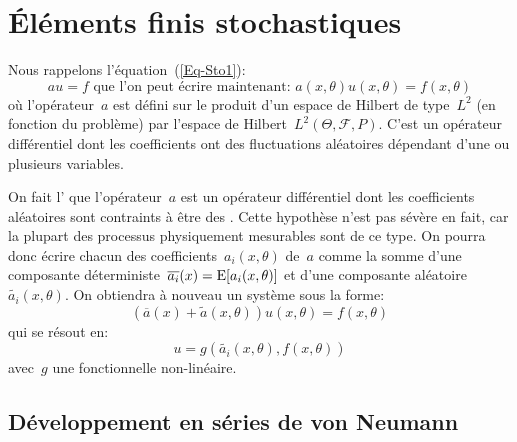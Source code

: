 \medskip
\section{Éléments finis stochastiques}

Nous rappelons l'équation~(\ref{Eq-Sto1}):
\begin{equation*}au=f \text{ que l'on peut écrire maintenant: } a(x,\theta) u(x,\theta) = f(x,\theta)\end{equation*}
où l'opérateur~$a$ est défini sur le produit d'un espace de Hilbert de type~$L^2$ (en fonction du problème) par l'espace de Hilbert~$L^2(\Theta,\mathcal{F},P)$.
C'est un opérateur différentiel dont les coefficients ont des fluctuations aléatoires dépendant d'une ou plusieurs variables.

\medskip
On fait l' que l'opérateur~$a$ est un opérateur différentiel dont les coefficients aléatoires sont contraints à être des .
Cette hypothèse n'est pas sévère en fait, car la plupart des processus physiquement mesurables sont de ce type.
On pourra donc écrire chacun des coefficients~$a_i(x,\theta)$ de~$a$ comme la somme d'une composante déterministe~$\overline{a_i}(x)=\operatorname{E}[a_i(x,\theta)]$ et d'une composante aléatoire~$\widetilde{a_i}(x,\theta)$.
On obtiendra à nouveau un système sous la forme:
\begin{equation}\label{Eq-Sto2}
(\overline{a}(x)+\widetilde{a}(x,\theta))u(x,\theta)=f(x,\theta)
\end{equation}
qui se résout en:
\begin{equation}
u=g(\widetilde{a_i}(x,\theta),f(x,\theta))
\end{equation}
avec~$g$ une fonctionnelle non-linéaire.

\medskip
\subsection{Développement en séries de von Neumann}

